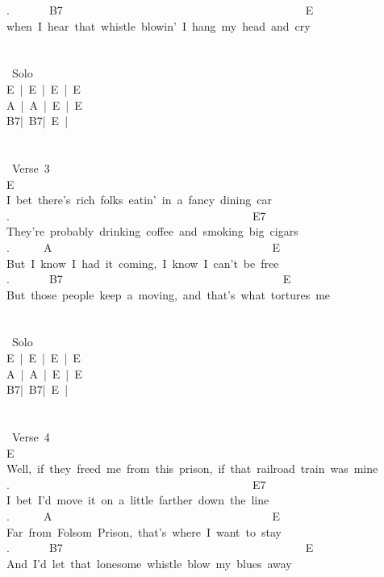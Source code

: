 {.\ \ \ \ \ \ \ B7\ \ \ \ \ \ \ \ \ \ \ \ \ \ \ \ \ \ \ \ \ \ \ \ \ \ \ \ \ \ \ \ \ \ \ \ \ \ \ \ \ \ \ E\\
when\ I\ hear\ that\ whistle\ blowin'\ I\ hang\ my\ head\ and\ cry\\
\\
\\
\lbrack\ Solo\rbrack\\
E\ |\ E\ |\ E\ |\ E\\
A\ |\ A\ |\ E\ |\ E\\
B7|\ B7|\ E\ |\ \\
\\
\\
\lbrack\ Verse\ 3\rbrack\ \\
E\\
I\ bet\ there's\ rich\ folks\ eatin'\ in\ a\ fancy\ dining\ car\\
.\ \ \ \ \ \ \ \ \ \ \ \ \ \ \ \ \ \ \ \ \ \ \ \ \ \ \ \ \ \ \ \ \ \ \ \ \ \ \ \ \ \ \ E7\\
They're\ probably\ drinking\ coffee\ and\ smoking\ big\ cigars\\
.\ \ \ \ \ \ A\ \ \ \ \ \ \ \ \ \ \ \ \ \ \ \ \ \ \ \ \ \ \ \ \ \ \ \ \ \ \ \ \ \ \ \ \ \ \ E\\
But\ I\ know\ I\ had\ it\ coming,\ I\ know\ I\ can't\ be\ free\\
.\ \ \ \ \ \ \ B7\ \ \ \ \ \ \ \ \ \ \ \ \ \ \ \ \ \ \ \ \ \ \ \ \ \ \ \ \ \ \ \ \ \ \ \ \ \ \ E\\
But\ those\ people\ keep\ a\ moving,\ and\ that's\ what\ tortures\ me\\
\\
\\
\lbrack\ Solo\rbrack\\
E\ |\ E\ |\ E\ |\ E\\
A\ |\ A\ |\ E\ |\ E\\
B7|\ B7|\ E\ |\ \\
\\
\ \\
\lbrack\ Verse\ 4\rbrack\\
E\\
Well,\ if\ they\ freed\ me\ from\ this\ prison,\ if\ that\ railroad\ train\ was\ mine\\
.\ \ \ \ \ \ \ \ \ \ \ \ \ \ \ \ \ \ \ \ \ \ \ \ \ \ \ \ \ \ \ \ \ \ \ \ \ \ \ \ \ \ \ E7\\
I\ bet\ I'd\ move\ it\ on\ a\ little\ farther\ down\ the\ line\\
.\ \ \ \ \ \ A\ \ \ \ \ \ \ \ \ \ \ \ \ \ \ \ \ \ \ \ \ \ \ \ \ \ \ \ \ \ \ \ \ \ \ \ \ \ \ E\\
Far\ from\ Folsom\ Prison,\ that's\ where\ I\ want\ to\ stay\\
.\ \ \ \ \ \ \ B7\ \ \ \ \ \ \ \ \ \ \ \ \ \ \ \ \ \ \ \ \ \ \ \ \ \ \ \ \ \ \ \ \ \ \ \ \ \ \ \ \ \ \ E\\
And\ I'd\ let\ that\ lonesome\ whistle\ blow\ my\ blues\ away}
